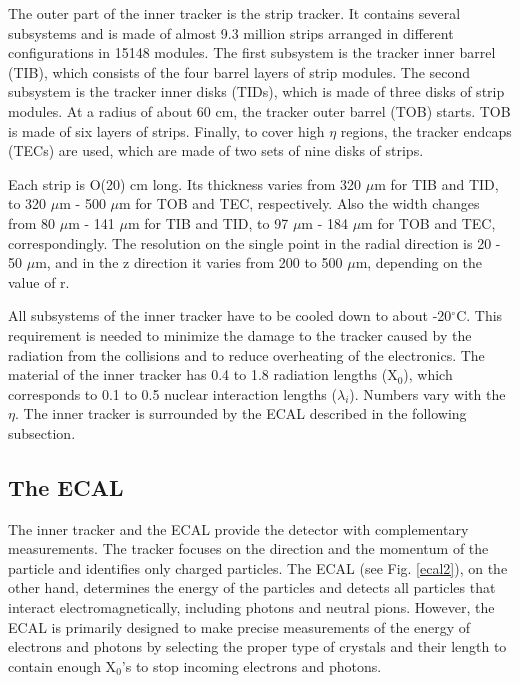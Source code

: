 \begin{normalsize}
The outer part of the inner tracker is the strip tracker. It contains several subsystems and is made of almost 9.3 million strips arranged in different configurations in 15148 modules. The first subsystem is the tracker inner barrel (TIB), which consists of the four barrel layers of strip modules. The second subsystem is the tracker inner disks (TIDs), which is made of three disks of strip modules. At a radius of about 60 cm, the tracker outer barrel (TOB) starts. TOB is made of six layers of strips. Finally, to cover high $\eta$ regions, the tracker endcaps (TECs) are used, which are made of two sets of nine disks of strips. 

Each strip is O(20) cm long. Its thickness varies from 320 $\mu$m  for TIB and TID, to 320 $\mu$m - 500 $\mu$m  for TOB and TEC, respectively. Also the width changes from 80 $\mu$m - 141 $\mu$m for TIB and TID, to 97 $\mu$m - 184 $\mu$m  for TOB and TEC, correspondingly. The resolution on the single point in the radial direction is 20 - 50 $\mu$m, and in the z direction it varies from 200 to 500 $\mu$m, depending on the value of r. 

All subsystems of the inner tracker have to be cooled down to about -20$^{\circ}$C.  This requirement is needed to minimize the damage to the tracker caused by the radiation from the collisions and to reduce overheating of the electronics. The material of the inner tracker has 0.4 to 1.8 radiation lengths (X$_0$), which corresponds to 0.1 to 0.5 nuclear interaction lengths ($\lambda_i $). Numbers vary with the $\eta$. The inner tracker is surrounded by the ECAL described in the following subsection.






\subsection{The ECAL}


The inner tracker and the ECAL provide the detector with complementary measurements. The tracker focuses on the direction and the momentum of the particle and identifies only charged particles. The ECAL  \cite{ECAL_attendum} (see Fig. \ref{ecal2}), on the other hand, determines the energy of the particles and detects all particles that interact electromagnetically, including photons and neutral pions. However, the ECAL is primarily designed to make precise measurements of the energy of electrons and photons by selecting the proper type of crystals and their length to contain enough X$_0$'s to stop incoming electrons and photons. 


\end{normalsize}
